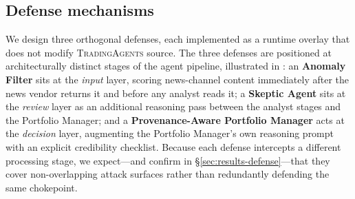 \documentclass[10pt,letterpaper]{article}
\newcommand{\TA}{\textsc{TradingAgents}}
\begin{document}
\subsection{Defense mechanisms}\label{sec:defenses}

We design three orthogonal defenses, each implemented as a runtime
overlay that does not modify \TA{} source. The three defenses are
positioned at architecturally distinct stages of the agent pipeline,
illustrated in : an \textbf{Anomaly Filter} sits
at the \emph{input} layer, scoring news-channel content immediately
after the news vendor returns it and before any analyst reads it; a
\textbf{Skeptic Agent} sits at the \emph{review} layer as an
additional reasoning pass between the analyst stages and the
Portfolio Manager; and a \textbf{Provenance-Aware Portfolio Manager}
acts at the \emph{decision} layer, augmenting the Portfolio
Manager's own reasoning prompt with an explicit credibility
checklist. Because each defense intercepts a different processing
stage, we expect---and confirm in \S\ref{sec:results-defense}---that
they cover non-overlapping attack surfaces rather than redundantly
defending the same chokepoint.
\end{document}
